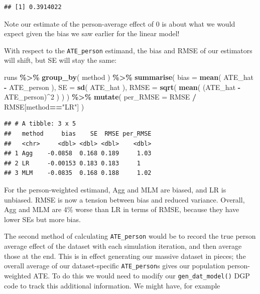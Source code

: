 \documentclass[
]{book}
\newenvironment{Shaded}{\begin{snugshade}}{\end{snugshade}}
\newcommand{\AttributeTok}[1]{\textcolor[rgb]{0.13,0.29,0.53}{#1}}
\newcommand{\DecValTok}[1]{\textcolor[rgb]{0.00,0.00,0.81}{#1}}
\newcommand{\FunctionTok}[1]{\textcolor[rgb]{0.13,0.29,0.53}{\textbf{#1}}}
\newcommand{\NormalTok}[1]{#1}
\newcommand{\SpecialCharTok}[1]{\textcolor[rgb]{0.81,0.36,0.00}{\textbf{#1}}}
\newcommand{\StringTok}[1]{\textcolor[rgb]{0.31,0.60,0.02}{#1}}
\begin{document}
\begin{verbatim}
## [1] 0.3914022
\end{verbatim}

Note our estimate of the person-average effect of 0 is about what we would expect given the bias we saw earlier for the linear model!

With respect to the \texttt{ATE\_person} estimand, the bias and RMSE of our estimators will shift, but SE will stay the same:

\begin{Shaded}
\begin{Highlighting}[]
\NormalTok{runs }\SpecialCharTok{\%\textgreater{}\%} 
  \FunctionTok{group\_by}\NormalTok{( method ) }\SpecialCharTok{\%\textgreater{}\%}
  \FunctionTok{summarise}\NormalTok{( }
    \AttributeTok{bias =} \FunctionTok{mean}\NormalTok{( ATE\_hat }\SpecialCharTok{{-}}\NormalTok{ ATE\_person ),}
    \AttributeTok{SE =} \FunctionTok{sd}\NormalTok{( ATE\_hat ),}
    \AttributeTok{RMSE =} \FunctionTok{sqrt}\NormalTok{( }\FunctionTok{mean}\NormalTok{( (ATE\_hat }\SpecialCharTok{{-}}\NormalTok{ ATE\_person)}\SpecialCharTok{\^{}}\DecValTok{2}\NormalTok{ ) )}
\NormalTok{  ) }\SpecialCharTok{\%\textgreater{}\%}
  \FunctionTok{mutate}\NormalTok{( }\AttributeTok{per\_RMSE =}\NormalTok{ RMSE }\SpecialCharTok{/}\NormalTok{ RMSE[method}\SpecialCharTok{==}\StringTok{"LR"}\NormalTok{] )}
\end{Highlighting}
\end{Shaded}

\begin{verbatim}
## # A tibble: 3 x 5
##   method     bias    SE  RMSE per_RMSE
##   <chr>     <dbl> <dbl> <dbl>    <dbl>
## 1 Agg    -0.0858  0.168 0.189     1.03
## 2 LR     -0.00153 0.183 0.183     1   
## 3 MLM    -0.0835  0.168 0.188     1.02
\end{verbatim}

For the person-weighted estimand, Agg and MLM are biased, and LR is unbiased.
RMSE is now a tension between bias and reduced variance.
Overall, Agg and MLM are 4\% worse than LR in terms of RMSE, because they have lower SEs but more bias.

The second method of calculating \texttt{ATE\_person} would be to record the true person average effect of the dataset with each simulation iteration, and then average those at the end. This is in effect generating our massive dataset in pieces; the overall average of our dataset-specific \texttt{ATE\_person}s gives our population person-weighted ATE.
To do this we would need to modify our \texttt{gen\_dat\_model()} DGP code to track this additional information.
We might have, for example
\end{document}
